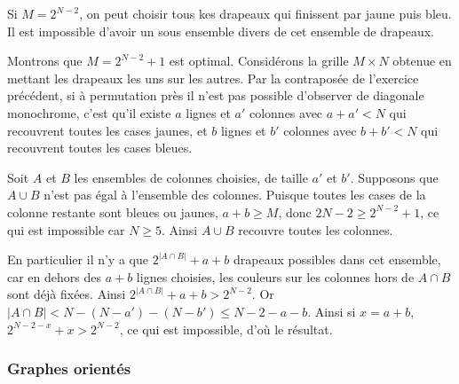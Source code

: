 \begin{sol}
Si $M=2^{N-2}$, on peut choisir tous kes drapeaux qui finissent par jaune puis bleu. Il est impossible d'avoir un sous ensemble divers de cet ensemble de drapeaux.

\medskip

Montrons que $M=2^{N-2}+1$ est optimal. Considérons la grille $M\times N$ obtenue en mettant les drapeaux les uns sur les autres. Par la contraposée de l'exercice précédent, si à permutation près il n'est pas possible d'observer de diagonale monochrome, c'est qu'il existe $a$ lignes et $a'$ colonnes avec $a+a'<N$ qui recouvrent toutes les cases jaunes, et $b$ lignes et $b'$ colonnes avec $b+b'<N$ qui recouvrent toutes les cases bleues.

\medskip


Soit $A$ et $B$ les ensembles de colonnes choisies, de taille $a'$ et $b'$. Supposons que $A\cup B$ n'est pas égal à l'ensemble des colonnes. Puisque toutes les cases de la colonne restante sont bleues ou jaunes, $a+b\geq M$, donc $2N-2\geq 2^{N-2}+1$, ce qui est impossible car $N\geq 5$. Ainsi $A\cup B$ recouvre toutes les colonnes.

\medskip

En particulier il n'y a que $2^{|A \cap B|}+a+b$ drapeaux possibles dans cet ensemble, car en dehors des $a+b$ lignes choisies, les couleurs sur les colonnes hors de $A\cap B$ sont déjà fixées. Ainsi $2^{|A \cap B|}+a+b> 2^{N-2}$. Or $|A\cap B|<N-(N-a')-(N-b')\leq N-2-a-b$. Ainsi si $x=a+b$, $2^{N-2-x}+x> 2^{N-2}$, ce qui est impossible, d'où le résultat.
\end{sol}


\subsubsection{Graphes orientés}

